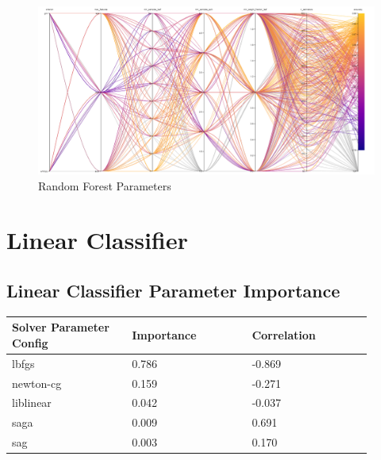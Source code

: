 \documentclass[11pt]{article}
\begin{document}
\begin{appendices}
\begin{figure}[h]
    \caption {Random Forest Parameters} \label{ParallelCoordRF}
    \centering 
    \includegraphics[width = \textwidth, height = \textwidth, keepaspectratio]{Images/RF ParallelCoordGraph.png}
\end{figure}


  
  \FloatBarrier
\newpage
\section{Linear Classifier}

\subsection{Linear Classifier Parameter Importance}
  \begin{table}[ht]
    \centering
    \begin{tabular}{|p{0.3\linewidth} | p{0.3\linewidth}| p{0.3\linewidth}|} 
      \hline
      \textbf{Solver Parameter Config}  & \textbf{Importance} & \textbf{Correlation} \\ \hline
      lbfgs & 0.786 & -0.869 \\ \hline
      newton-cg & 0.159 & -0.271 \\ \hline
      liblinear & 0.042 & -0.037 \\ \hline
      saga & 0.009 & 0.691 \\ \hline
      sag & 0.003 & 0.170 \\ \hline
    \end{tabular}
  \end{table}\label{LC_ParamImp1}


\end{appendices}
\end{document}

